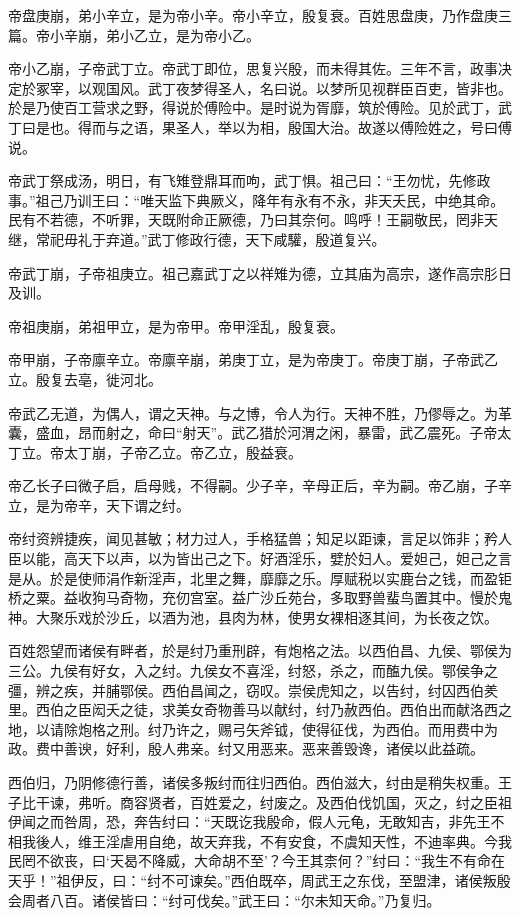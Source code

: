 \documentclass[UTF8,12pt,AutoFakeBold]{ctexart}
\begin{document}
	帝盘庚崩，弟小辛立，是为帝小辛。帝小辛立，殷复衰。百姓思盘庚，乃作盘庚三篇。帝小辛崩，弟小乙立，是为帝小乙。
	
	帝小乙崩，子帝武丁立。帝武丁即位，思复兴殷，而未得其佐。三年不言，政事决定於冢宰，以观国风。武丁夜梦得圣人，名曰说。以梦所见视群臣百吏，皆非也。於是乃使百工营求之野，得说於傅险中。是时说为胥靡，筑於傅险。见於武丁，武丁曰是也。得而与之语，果圣人，举以为相，殷国大治。故遂以傅险姓之，号曰傅说。
		
	帝武丁祭成汤，明日，有飞雉登鼎耳而呴，武丁惧。祖己曰：“王勿忧，先修政事。”祖己乃训王曰：“唯天监下典厥义，降年有永有不永，非天夭民，中绝其命。民有不若德，不听罪，天既附命正厥德，乃曰其奈何。鸣呼！王嗣敬民，罔非天继，常祀毋礼于弃道。”武丁修政行德，天下咸驩，殷道复兴。
	
	帝武丁崩，子帝祖庚立。祖己嘉武丁之以祥雉为德，立其庙为高宗，遂作高宗肜日及训。
	
	帝祖庚崩，弟祖甲立，是为帝甲。帝甲淫乱，殷复衰。
	
	帝甲崩，子帝廪辛立。帝廪辛崩，弟庚丁立，是为帝庚丁。帝庚丁崩，子帝武乙立。殷复去亳，徙河北。
	
	帝武乙无道，为偶人，谓之天神。与之博，令人为行。天神不胜，乃僇辱之。为革囊，盛血，昂而射之，命曰“射天”。武乙猎於河渭之闲，暴雷，武乙震死。子帝太丁立。帝太丁崩，子帝乙立。帝乙立，殷益衰。
	
	帝乙长子曰微子启，启母贱，不得嗣。少子辛，辛母正后，辛为嗣。帝乙崩，子辛立，是为帝辛，天下谓之纣。
	
	帝纣资辨捷疾，闻见甚敏；材力过人，手格猛兽；知足以距谏，言足以饰非；矜人臣以能，高天下以声，以为皆出己之下。好酒淫乐，嬖於妇人。爱妲己，妲己之言是从。於是使师涓作新淫声，北里之舞，靡靡之乐。厚赋税以实鹿台之钱，而盈钜桥之粟。益收狗马奇物，充仞宫室。益广沙丘苑台，多取野兽蜚鸟置其中。慢於鬼神。大聚乐戏於沙丘，以酒为池，县肉为林，使男女裸相逐其间，为长夜之饮。
	
	百姓怨望而诸侯有畔者，於是纣乃重刑辟，有炮格之法。以西伯昌、九侯、鄂侯为三公。九侯有好女，入之纣。九侯女不喜淫，纣怒，杀之，而醢九侯。鄂侯争之彊，辨之疾，并脯鄂侯。西伯昌闻之，窃叹。崇侯虎知之，以告纣，纣囚西伯羑里。西伯之臣闳夭之徒，求美女奇物善马以献纣，纣乃赦西伯。西伯出而献洛西之地，以请除炮格之刑。纣乃许之，赐弓矢斧钺，使得征伐，为西伯。而用费中为政。费中善谀，好利，殷人弗亲。纣又用恶来。恶来善毁谗，诸侯以此益疏。
	
	西伯归，乃阴修德行善，诸侯多叛纣而往归西伯。西伯滋大，纣由是稍失权重。王子比干谏，弗听。商容贤者，百姓爱之，纣废之。及西伯伐饥国，灭之，纣之臣祖伊闻之而咎周，恐，奔告纣曰：“天既讫我殷命，假人元龟，无敢知吉，非先王不相我後人，维王淫虐用自绝，故天弃我，不有安食，不虞知天性，不迪率典。今我民罔不欲丧，曰‘天曷不降威，大命胡不至’？今王其柰何？”纣曰：“我生不有命在天乎！”祖伊反，曰：“纣不可谏矣。”西伯既卒，周武王之东伐，至盟津，诸侯叛殷会周者八百。诸侯皆曰：“纣可伐矣。”武王曰：“尔未知天命。”乃复归。
	
\end{document}
